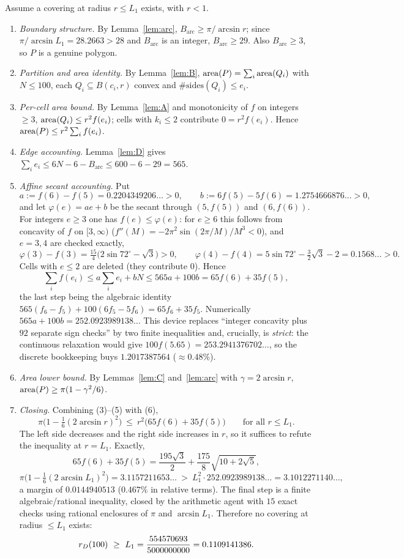 Assume a covering at radius $r\le L_1$ exists, with $r<1$.

\begin{enumerate}[leftmargin=1.8em,itemsep=3pt]
\item[(1)] \emph{Boundary structure.} By Lemma~\ref{lem:arc}, $B_{\mathrm{arc}}\ge\pi/\arcsin r$;
since $\pi/\arcsin L_1=28.2663>28$ and $B_{\mathrm{arc}}$ is an integer, $B_{\mathrm{arc}}\ge29$.
Also $B_{\mathrm{arc}}\ge3$, so $P$ is a genuine polygon.
\item[(2)] \emph{Partition and area identity.} By Lemma~\ref{lem:B},
$\operatorname{area}(P)=\sum_i\operatorname{area}(Q_i)$ with $N\le100$, each $Q_i\subseteq B(c_i,r)$ convex and
$\#\text{sides}(Q_i)\le e_i$.
\item[(3)] \emph{Per-cell area bound.} By Lemma~\ref{lem:A} and monotonicity of $f$ on integers
$\ge3$, $\operatorname{area}(Q_i)\le r^2f(e_i)$; cells with $k_i\le2$ contribute $0=r^2f(e_i)$.
Hence $\operatorname{area}(P)\le r^2\sum_if(e_i)$.
\item[(4)] \emph{Edge accounting.} Lemma~\ref{lem:D} gives
$\sum_ie_i\le6N-6-B_{\mathrm{arc}}\le600-6-29=565$.
\item[(5)] \emph{Affine secant accounting.} Put
\[
a:=f(6)-f(5)=0.2204349206\ldots>0,\qquad
b:=6f(5)-5f(6)=1.2754666876\ldots>0,
\]
and let $\varphi(e)=ae+b$ be the secant through $(5,f(5))$ and $(6,f(6))$. For integers $e\ge3$
one has $f(e)\le\varphi(e)$: for $e\ge6$ this follows from concavity of $f$ on $[3,\infty)$
($f''(M)=-2\pi^2\sin(2\pi/M)/M^3<0$), and $e=3,4$ are checked exactly,
\[
\varphi(3)-f(3)=\tfrac{15}4\bigl(2\sin72^\circ-\sqrt3\bigr)>0,\qquad
\varphi(4)-f(4)=5\sin72^\circ-\tfrac32\sqrt3-2=0.1568\ldots>0 .
\]
Cells with $e\le2$ are deleted (they contribute $0$). Hence
\[
\sum_if(e_i)\le a\sum_ie_i+bN\le565a+100b=65f(6)+35f(5),
\]
the last step being the algebraic identity
$565(f_6-f_5)+100(6f_5-5f_6)=65f_6+35f_5$. Numerically $565a+100b=252.0923989138\ldots$
This device replaces ``integer concavity plus $92$ separate sign checks'' by two finite
inequalities and, crucially, is \emph{strict}: the continuous relaxation would give
$100f(5.65)=253.2941376702\ldots$, so the discrete bookkeeping buys $1.2017387564$ ($\approx0.48\%$).
\item[(6)] \emph{Area lower bound.} By Lemmas~\ref{lem:C} and~\ref{lem:arc} with
$\gamma=2\arcsin r$, $\operatorname{area}(P)\ge\pi(1-\gamma^2/6)$.
\item[(7)] \emph{Closing.} Combining (3)--(5) with (6),
\[
\pi\bigl(1-\tfrac16(2\arcsin r)^2\bigr)\ \le\ r^2\bigl(65f(6)+35f(5)\bigr)
\qquad\text{for all }r\le L_1 .
\]
The left side decreases and the right side increases in $r$, so it suffices to refute the inequality
at $r=L_1$. Exactly,
\[
65f(6)+35f(5)=\frac{195\sqrt3}{2}+\frac{175}{8}\sqrt{10+2\sqrt5},
\]
\[
\pi\bigl(1-\tfrac16(2\arcsin L_1)^2\bigr)=3.1157211653\ldots
\ >\ L_1^2\cdot252.0923989138\ldots=3.1012271140\ldots,
\]
a margin of $0.0144940513$ ($0.467\%$ in relative terms). The final step is a finite
algebraic/rational inequality, closed by the arithmetic agent with $15$ exact checks using rational
enclosures of $\pi$ and $\arcsin L_1$. Therefore no covering at radius $\le L_1$ exists:
\[
\rD(100)\ \ge\ L_1=\frac{554570693}{5000000000}=0.1109141386 .
\]
\end{enumerate}

